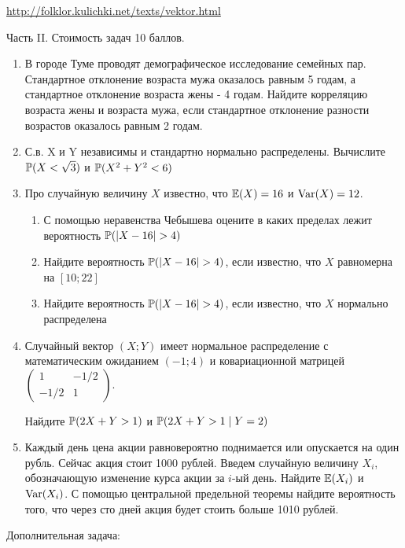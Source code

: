 \documentclass[pdftex,12pt,a4paper]{article}
\begin{document}
\begin{enumerate}
\url{http://folklor.kulichki.net/texts/vektor.html} 

\end{enumerate}

Часть II. Стоимость задач 10 баллов.

\begin{enumerate}
\item В  городе Туме проводят демографическое исследование семейных пар. Стандартное отклонение возраста мужа оказалось равным 5 годам, а стандартное отклонение возраста жены - 4 годам. Найдите корреляцию возраста жены и возраста мужа, если стандартное отклонение разности возрастов оказалось равным 2 годам.

\item С.в. X и Y независимы и стандартно нормально распределены. Вычислите $\P(X<\sqrt{3})$ и $\P(X^2+Y^2<6)$

\item  Про случайную величину $X$ известно, что $\E(X)=16$ и $\Var(X)=12$.
\begin{enumerate}
\item С помощью неравенства Чебышева оцените в каких пределах лежит вероятность $\P(|X-16|>4)$
\item Найдите вероятность $\P(|X-16|>4)$, если известно, что $X$ равномерна на $[10;22]$
\item Найдите вероятность $\P(|X-16|>4)$, если известно, что $X$ нормально распределена
\end{enumerate}


\item Случайный вектор $(X;Y)$ имеет нормальное распределение с математическим ожиданием $(-1;4)$ и ковариационной матрицей $\left( \begin{array}{cc}
1 & -1/2 \\ 
-1/2 & 1
\end{array} \right)$. 


Найдите   $\P(2X+Y>1)$ и $\P(2X+Y>1 \mid Y=2)$

\item Каждый день цена акции равновероятно поднимается или опускается на один рубль. Сейчас акция стоит 1000 рублей. Введем случайную величину $X_i$, обозначающую изменение курса акции за $i$-ый день. Найдите $\E(X_i)$  и $\Var(X_i)$. С помощью центральной предельной теоремы найдите вероятность того, что через сто дней акция будет стоить больше 1010 рублей.
\end{enumerate}



Дополнительная задача:
\end{document}
